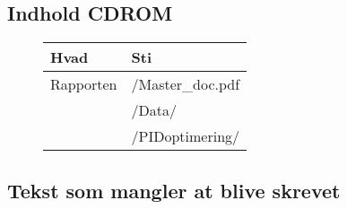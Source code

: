 \newpage



\newlength\mylen
\renewcommand\thepart{\Roman{part}}
\renewcommand\cftpartpresnum{Part~}
\settowidth\mylen{\bfseries\cftpartpresnum\cftpartaftersnum}
\addtolength\cftpartnumwidth{\mylen}


\tableofcontents
\listoffigures
\listoftables  

\subsection*{Indhold CDROM}
\begin{figure}[th!]
\centering
\begin{tabular}{l|l}
Hvad&Sti\\\hline
Rapporten&/Master\_doc.pdf\\
&/Data/\\
&/PIDoptimering/\\

\end{tabular}
\captionsetup{type=table}
\label{tb:CD}
\end{figure}






\newpage
\subsection*{Tekst som mangler at blive skrevet}
\listoftodos